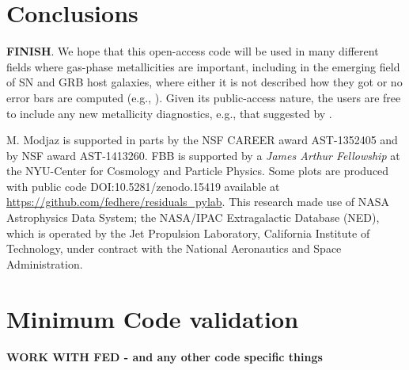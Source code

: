 \documentclass{emulateapj}
\begin{document}
\section{Conclusions}\label{comp_sec}

 \textbf{FINISH}. We hope that this open-access code will be used in many different fields where gas-phase metallicities are important, including in the emerging field of SN and GRB host galaxies, where either it is not described how they got  or no error bars are computed (e.g., \citealt{lunnan14}). Given its public-access nature, the users are free to include any new metallicity diagnostics, e.g., that suggested by \citet{dopita13}.

\acknowledgements
M. Modjaz is supported in parts by the NSF CAREER award AST-1352405 and by NSF award AST-1413260. FBB is supported by a \emph{James Arthur Fellowship} at the NYU-Center for Cosmology and Particle Physics. Some plots are  produced with public code DOI:10.5281/zenodo.15419 available at \url{https://github.com/fedhere/residuals_pylab}.
 This research made use of NASA Astrophysics Data
System; the NASA/IPAC Extragalactic Database (NED), which
is operated by the Jet Propulsion Laboratory, California Institute
of Technology, under contract with the National Aeronautics
and Space Administration.








%

\appendix

\section{Minimum Code validation}
\textbf{WORK WITH FED - and any other code specific things}
\end{document}
